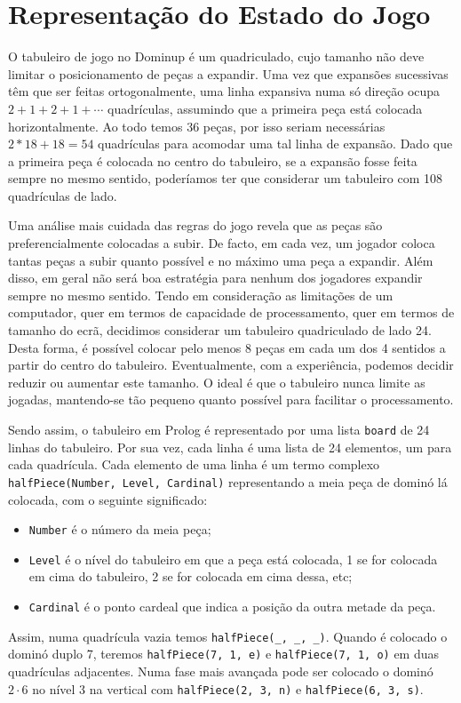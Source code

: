 \documentclass[a4paper]{article}
\begin{document}
\section{Representação do Estado do Jogo}

O tabuleiro de jogo no Dominup é um quadriculado, cujo tamanho não deve limitar o posicionamento de peças a expandir. Uma vez que expansões sucessivas têm que ser feitas ortogonalmente, uma linha expansiva numa só direção ocupa $2 + 1 + 2 + 1 + \cdots$ quadrículas, assumindo que a primeira peça está colocada horizontalmente. Ao todo temos 36 peças, por isso seriam necessárias $2 * 18 + 18 = 54$ quadrículas para acomodar uma tal linha de expansão. Dado que a primeira peça é colocada no centro do tabuleiro, se a expansão fosse feita sempre no mesmo sentido, poderíamos ter que considerar um tabuleiro com 108 quadrículas de lado.

Uma análise mais cuidada das regras do jogo revela que as peças são preferencialmente colocadas a subir. De facto, em cada vez, um jogador coloca tantas peças a subir quanto possível e no máximo uma peça a expandir. Além disso, em geral não será boa estratégia para nenhum dos jogadores expandir sempre no mesmo sentido. Tendo em consideração as limitações de um computador, quer em termos de capacidade de processamento, quer em termos de tamanho do ecrã, decidimos considerar um tabuleiro quadriculado de lado 24. Desta forma, é possível colocar pelo menos 8 peças em cada um dos 4 sentidos a partir do centro do tabuleiro. Eventualmente, com a experiência, podemos decidir reduzir ou aumentar este tamanho. O ideal é que o tabuleiro nunca limite as jogadas, mantendo-se tão pequeno quanto possível para facilitar o processamento.

Sendo assim, o tabuleiro em Prolog é representado por uma lista \verb|board| de 24 linhas do tabuleiro. Por sua vez, cada linha é uma lista de 24 elementos, um para cada quadrícula. Cada elemento de uma linha é um termo complexo \verb|halfPiece(Number, Level, Cardinal)| representando a meia peça de dominó lá colocada, com o seguinte significado:
\begin{itemize}
	\item \verb|Number| é o número da meia peça;
	\item \verb|Level| é o nível do tabuleiro em que a peça está colocada, 1 se for colocada em cima do tabuleiro, 2 se for colocada em cima dessa, etc;
	\item \verb|Cardinal| é o ponto cardeal que indica a posição da outra metade da peça.
\end{itemize}
Assim, numa quadrícula vazia temos \verb|halfPiece(_, _, _)|. Quando é colocado o dominó duplo 7, teremos \verb|halfPiece(7, 1, e)| e \verb|halfPiece(7, 1, o)| em duas quadrículas adjacentes. Numa fase mais avançada pode ser colocado o dominó $2 \cdot 6$ no nível 3 na vertical com \verb|halfPiece(2, 3, n)| e \verb|halfPiece(6, 3, s)|.
\end{document}
